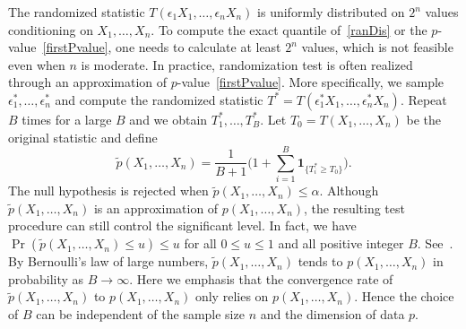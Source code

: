 \documentclass[3p]{elsarticle}
\theoremstyle{plain}
\theoremstyle{definition}
\theoremstyle{remark}
\begin{document}
 The randomized statistic $T(\epsilon_1 X_1,\ldots,\epsilon_n X_n)$ is uniformly distributed on $2^n$ values conditioning on $X_1,\ldots, X_n$.
To compute the exact quantile of~\eqref{ranDis} or the $p$-value~\eqref{firstPvalue}, one needs to calculate at least $2^n$ values, which is not feasible even when $n$ is moderate.
In practice, randomization test is often realized through an approximation of $p$-value~\eqref{firstPvalue}.
More specifically, we sample  $\epsilon_1^*,\ldots,\epsilon_n^*$ and compute the randomized statistic $T^*=T(\epsilon_1^* X_1,\ldots,\epsilon_n^* X_n)$.
Repeat $B$ times for a large $B$ and we obtain $T_1^*,\ldots,T_B^*$.
Let $T_0=T(X_1,\ldots,X_n)$ be the original statistic and define
\begin{equation*}
\tilde{p}(X_1,\ldots,X_n)=\frac{1}{B+1}\big(1+\sum_{i=1}^B \mathbf{1}_{\{T_i^*\geq T_0\}}\big).
\end{equation*}
The null hypothesis is rejected when $\tilde{p}(X_1,\ldots,X_n)\leq \alpha$.
Although $\tilde{p}(X_1,\ldots, X_n)$ is an approximation of $p(X_1,\ldots, X_n)$, the resulting test procedure can still control the significant level.
In fact, we have
$\Pr(\tilde{p}(X_1,\ldots,X_n)\leq u)\leq u$ for all $0\leq u\leq 1$ and all positive integer $B$.
See~\citet[Page $636$]{Lehmann}.
By Bernoulli's law of large numbers, $\tilde{p}(X_1,\ldots,X_n)$ tends to $p(X_1,\ldots,X_n)$ in probability  as $B\to \infty$.
{Here we emphasis that the convergence rate of $\tilde{p}(X_1,\ldots,X_n)$ to $p(X_1,\ldots,X_n)$ only relies on $p(X_1,\ldots,X_n)$.
Hence the choice of $B$ can be independent of the sample size $n$ and the dimension of data $p$.}
\end{document}

